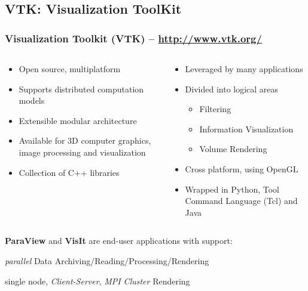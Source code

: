 \subsection{VTK: Visualization ToolKit}

\begin{frame}
\frametitle{Visualization Toolkit (VTK) -- \url{http://www.vtk.org/}}

\begin{columns}
\begin{column}{5.75cm}
\begin{itemize}
        \item Open source, multiplatform
        \item Supports distributed computation models
        \item Extensible modular architecture
        \item Available for 3D computer graphics, image processing and visualization
        \item Collection of C++ libraries
\end{itemize}
\end{column}
\begin{column}{5.75cm}
\begin{itemize}
        \item Leveraged by many applications
        \item Divided into logical areas
                \begin{itemize}
                        \item Filtering
                        \item Information Visualization
                        \item  Volume Rendering
                \end{itemize}
        \item Cross platform, using OpenGL
        \item Wrapped in Python, Tool Command Language (Tcl) and Java
\end{itemize}
\end{column}
\end{columns}

\vspace{2mm}
\begin{block}{\textcolor{DarkBlue}{} {\bf ParaView} and {\bf VisIt} are end-user applications with support:}

\hspace{5mm}
\textcolor{DarkBlue}{} \textit{parallel} Data Archiving/Reading/Processing/Rendering

\hspace{5mm}
\textcolor{DarkBlue}{} single node, \textit{Client-Server}, \textit{MPI Cluster} Rendering
\end{block}
\end{frame}

